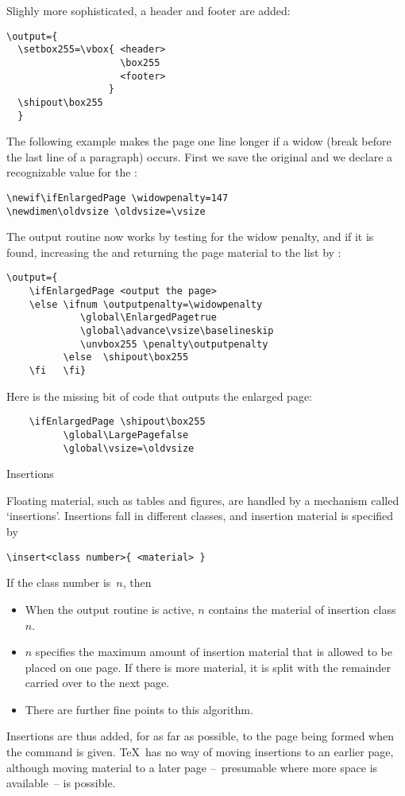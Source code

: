 Slighly more sophisticated, a header and footer are added:
\begin{verbatim}
\output={
  \setbox255=\vbox{ <header>
                    \box255
                    <footer>
                  }
  \shipout\box255
  }
\end{verbatim}

The following example makes the page one line longer if a widow (break
before the last line of a paragraph) occurs. First we save the
original  and we declare a recognizable value for the
:
\begin{verbatim}
\newif\ifEnlargedPage \widowpenalty=147
\newdimen\oldvsize \oldvsize=\vsize
\end{verbatim}
The output routine now works by testing for the widow penalty, and if
it is found, increasing the  and returning the page material
to the list by :
\begin{verbatim}
\output={
    \ifEnlargedPage <output the page>
    \else \ifnum \outputpenalty=\widowpenalty
             \global\EnlargedPagetrue
             \global\advance\vsize\baselineskip
             \unvbox255 \penalty\outputpenalty
          \else  \shipout\box255
    \fi   \fi}
\end{verbatim}
Here is the missing bit of code that outputs the enlarged page:
\begin{verbatim}
    \ifEnlargedPage \shipout\box255 
          \global\LargePagefalse
          \global\vsize=\oldvsize
\end{verbatim}

 {Insertions}

Floating material, such as tables and figures, are handled by a
mechanism called `insertions'. Insertions fall in different classes,
and insertion material is specified by
\begin{verbatim}
\insert<class number>{ <material> }
\end{verbatim}
If the class number is~$n$, then
\begin{itemize}
\item When the output routine is active, $n$ contains the
  material of insertion class~$n$.
\item {}$n$ specifies the maximum amount of insertion material
  that is allowed to be placed on one page. If there is more material,
  it is split with the remainder carried over to the next page.
\item There are further fine points to this algorithm.
\end{itemize}
Insertions are thus added, for as far as possible, to the page being
formed when the  command is given. \TeX\ has no way of
moving insertions to an earlier page, although moving material to a
later page --~presumable where more space is available~-- is possible.

